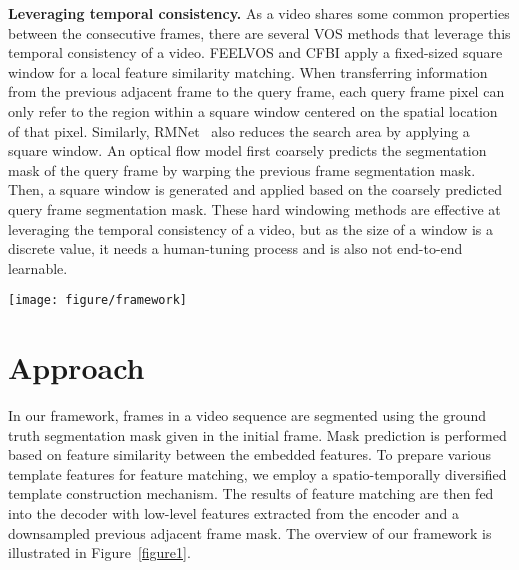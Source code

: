 \documentclass[runningheads]{llncs}
\begin{document}
\noindent\textbf{Leveraging temporal consistency.} As a video shares some common properties between the consecutive frames, there are several VOS methods that leverage this temporal consistency of a video. FEELVOS and CFBI apply a fixed-sized square window for a local feature similarity matching. When transferring information from the previous adjacent frame to the query frame, each query frame pixel can only refer to the region within a square window centered on the spatial location of that pixel. Similarly, RMNet~\cite{RMNet} also reduces the search area by applying a square window. An optical flow model first coarsely predicts the segmentation mask of the query frame by warping the previous frame segmentation mask. Then, a square window is generated and applied based on the coarsely predicted query frame segmentation mask. These hard windowing methods are effective at leveraging the temporal consistency of a video, but as the size of a window is a discrete value, it needs a human-tuning process and is also not end-to-end learnable. 



\begin{figure*}[t]
	\centering
	\texttt{[image: figure/framework]}
	\caption{Architecture of our proposed method. The templates for feature similarity matching are independently constructed and updated as per their own objectives. The spatial diversity and temporal diversity of the templates are represented horizontally and vertically, respectively. Several components, e.g., skip connections and mask propagation, are omitted for better clarification of the overall architecture.}
	\label{figure1}
\end{figure*}



\section{Approach} 
In our framework, frames in a video sequence are segmented using the ground truth segmentation mask given in the initial frame. Mask prediction is performed based on feature similarity between the embedded features. To prepare various template features for feature matching, we employ a spatio-temporally diversified template construction mechanism. The results of feature matching are then fed into the decoder with low-level features extracted from the encoder and a downsampled previous adjacent frame mask. The overview of our framework is illustrated in Figure~\ref{figure1}.
\end{document}
